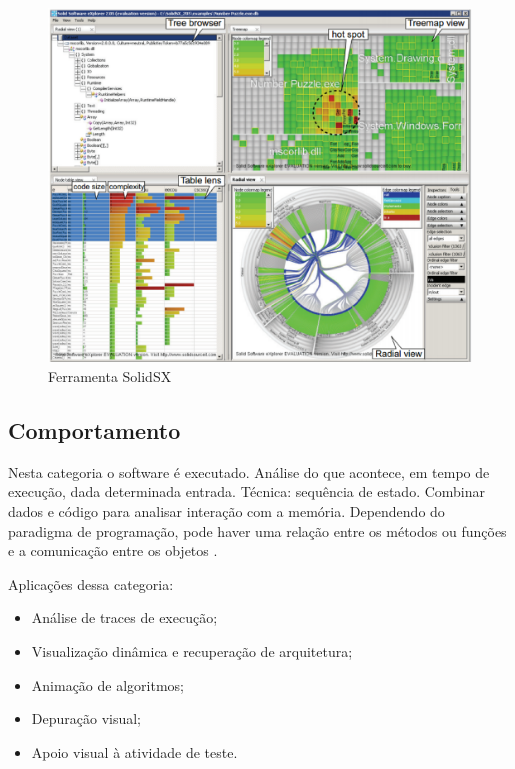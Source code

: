 \begin{figure}[!htb]
  \centering
    \includegraphics[keepaspectratio=true,scale=0.5]
    {figuras/solidSX.eps}
  \caption{Ferramenta SolidSX \cite{reniers2011visual}}
  \label{fig:solidSX}
\end{figure}

\subsection{Comportamento}

Nesta categoria o software é executado. Análise do que acontece, em tempo de execução, dada
determinada entrada. Técnica: sequência de estado. Combinar dados e código para
analisar interação com a memória. Dependendo do paradigma de programação, pode
haver uma relação entre os métodos ou funções e a comunicação entre os objetos
\cite{cornelissen2009systematic} \cite{diehl2007software}.

Aplicações dessa categoria:

\begin{itemize}
	\item Análise de traces de execução;
	\item Visualização dinâmica e recuperação de arquitetura;
	\item Animação de algoritmos;
	\item Depuração visual;
	\item Apoio visual à atividade de teste.
\end{itemize}

